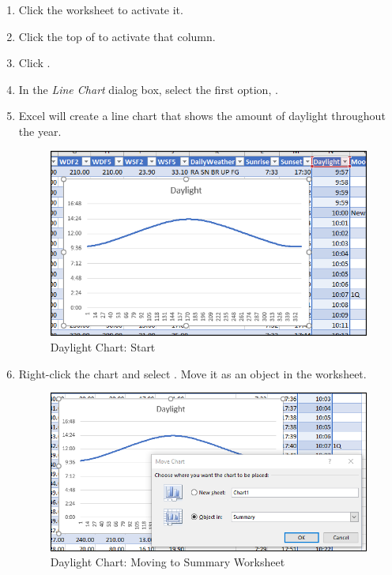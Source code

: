 \begin{enumerate}
	\item Click the  worksheet to activate it.
	\item Click the top of  to activate that column.
	\item Click .
	\item In the \textit{Line Chart} dialog box, select the first option, .
	\item Excel will create a line chart that shows the amount of daylight throughout the year. 
	
	\begin{figure}[H]
		\centering
		\includegraphics[width=\maxwidth{.95\linewidth}]{gfx/ch09_fig88}
		\caption{Daylight Chart: Start}
		\label{09:fig88}
	\end{figure}
	
	\item Right-click the chart and select . Move it as an object in the  worksheet.

	\begin{figure}[H]
		\centering
		\includegraphics[width=\maxwidth{.95\linewidth}]{gfx/ch09_fig89}
		\caption{Daylight Chart: Moving to Summary Worksheet}
		\label{09:fig89}
	\end{figure}


\end{enumerate}
